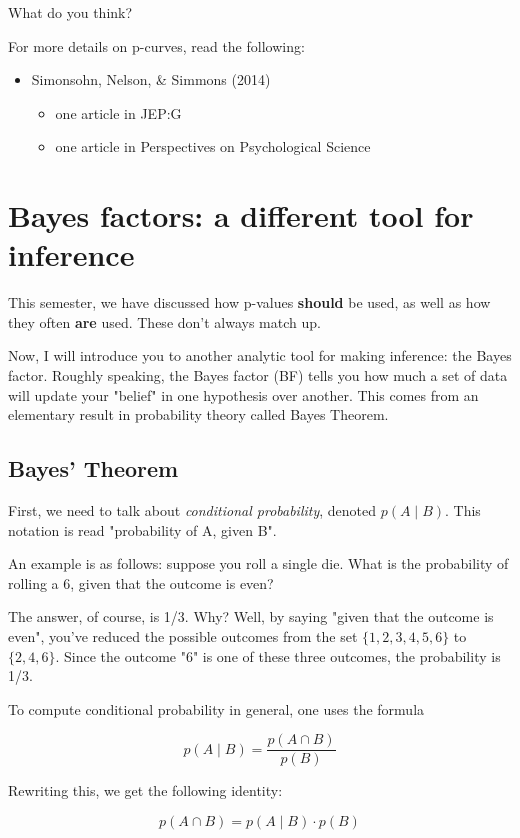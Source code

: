 \documentclass[article,10pt]{article}
\begin{document}
What do you think?

For more details on p-curves, read the following:
\begin{itemize}
\item Simonsohn, Nelson, \& Simmons (2014)
\begin{itemize}
\item one article in JEP:G
\item one article in Perspectives on Psychological Science
\end{itemize}
\end{itemize}


\section*{Bayes factors: a different tool for inference}
\label{sec-2}

This semester, we have discussed how p-values \textbf{should} be used, as well as how they often \textbf{are} used.  These don't always match up.

Now, I will introduce you to another analytic tool for making inference: the Bayes factor.  Roughly speaking, the Bayes factor (BF) tells you how much a set of data will update your "belief" in one hypothesis over another.  This comes from an elementary result in probability theory called Bayes Theorem.

\subsection*{Bayes' Theorem}
\label{sec-2-1}

First, we need to talk about \emph{conditional probability}, denoted $p(A \mid B)$.  This notation is read "probability of A, given B".

An example is as follows:  suppose you roll a single die.  What is the probability of rolling a 6, given that the outcome is even?

The answer, of course, is 1/3.  Why?  Well, by saying "given that the outcome is even", you've reduced the possible outcomes from the set $\{1,2,3,4,5,6\}$ to $\{2,4,6\}$.  Since the outcome "6" is one of these three outcomes, the probability is 1/3.

To compute conditional probability in general, one uses the formula 

\[
p(A\mid B) = \frac{p(A\cap B)}{p(B)}
\]

Rewriting this, we get the following identity:

\[
p(A\cap B) = p(A\mid B)\cdot p(B)
\]
\end{document}
